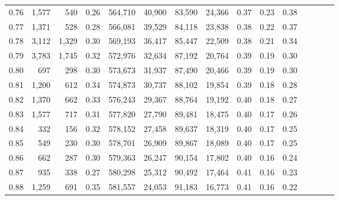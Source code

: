 \begin{tabular}{rrrcrrrrrrrrrrr}
0.76 &   1,577 &     540 &                                       0.26 &  564,710 &   40,900 &   83,590 &   24,366 &  0.37 &  0.23 &                         0.38 \\
0.77 &   1,371 &     528 &                                       0.28 &  566,081 &   39,529 &   84,118 &   23,838 &  0.38 &  0.22 &                         0.37 \\
0.78 &   3,112 &   1,329 &                                       0.30 &  569,193 &   36,417 &   85,447 &   22,509 &  0.38 &  0.21 &                         0.34 \\
0.79 &   3,783 &   1,745 &                                       0.32 &  572,976 &   32,634 &   87,192 &   20,764 &  0.39 &  0.19 &                         0.30 \\
0.80 &     697 &     298 &                                       0.30 &  573,673 &   31,937 &   87,490 &   20,466 &  0.39 &  0.19 &                         0.30 \\
0.81 &   1,200 &     612 &                                       0.34 &  574,873 &   30,737 &   88,102 &   19,854 &  0.39 &  0.18 &                         0.28 \\
0.82 &   1,370 &     662 &                                       0.33 &  576,243 &   29,367 &   88,764 &   19,192 &  0.40 &  0.18 &                         0.27 \\
0.83 &   1,577 &     717 &                                       0.31 &  577,820 &   27,790 &   89,481 &   18,475 &  0.40 &  0.17 &                         0.26 \\
0.84 &     332 &     156 &                                       0.32 &  578,152 &   27,458 &   89,637 &   18,319 &  0.40 &  0.17 &                         0.25 \\
0.85 &     549 &     230 &                                       0.30 &  578,701 &   26,909 &   89,867 &   18,089 &  0.40 &  0.17 &                         0.25 \\
0.86 &     662 &     287 &                                       0.30 &  579,363 &   26,247 &   90,154 &   17,802 &  0.40 &  0.16 &                         0.24 \\
0.87 &     935 &     338 &                                       0.27 &  580,298 &   25,312 &   90,492 &   17,464 &  0.41 &  0.16 &                         0.23 \\
0.88 &   1,259 &     691 &                                       0.35 &  581,557 &   24,053 &   91,183 &   16,773 &  0.41 &  0.16 &                         0.22 \\

\end{tabular}
